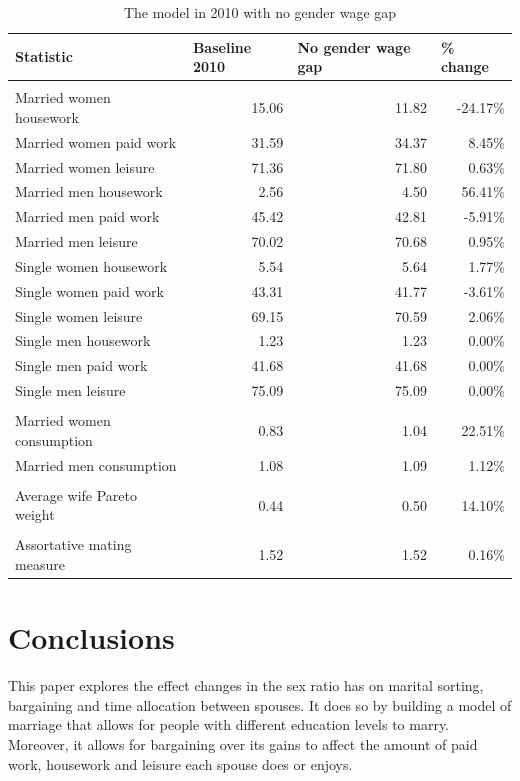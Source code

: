 \documentclass[12pt]{article}
\begin{document}
\begin{table}[]
	\centering
	\caption{The model in 2010 with no gender wage gap}
	\begin{tabular}{lrrr}
		\toprule
		Statistic & \multicolumn{1}{l}{Baseline 2010} & \multicolumn{1}{l}{No gender wage gap} & \multicolumn{1}{l}{\% change} \\
		\midrule
		&       &       &  \\
		Married women housework & 15.06 & 11.82 & -24.17\% \\
		Married women paid work & 31.59 & 34.37 & 8.45\% \\
		Married women leisure & 71.36 & 71.80 & 0.63\% \\
		Married men housework & 2.56  & 4.50  & 56.41\% \\
		Married men paid work & 45.42 & 42.81 & -5.91\% \\
		Married men leisure & 70.02 & 70.68 & 0.95\% \\
		Single women housework & 5.54  & 5.64  & 1.77\% \\
		Single women paid work & 43.31 & 41.77 & -3.61\% \\
		Single women leisure & 69.15 & 70.59 & 2.06\% \\
		Single men housework & 1.23  & 1.23  & 0.00\% \\
		Single men paid work & 41.68 & 41.68 & 0.00\% \\
		Single men leisure & 75.09 & 75.09 & 0.00\% \\
		&       &       &  \\
		Married women consumption & 0.83  & 1.04  & 22.51\% \\
		Married men consumption & 1.08  & 1.09  & 1.12\% \\
		&       &       &  \\
		Average wife Pareto weight & 0.44  & 0.50  & 14.10\% \\
		&       &       &  \\
		Assortative mating measure & 1.52  & 1.52  & 0.16\% \\
		\bottomrule
		\bottomrule
	\end{tabular}
	\label{tab:quant_exp_3}
\end{table}


\section{Conclusions} \label{sec:conclusions}

This paper explores the effect changes in the sex ratio has on marital sorting, bargaining and time allocation between spouses. It does so by building a model of marriage that allows for people with different education levels to marry. Moreover, it allows for bargaining over its gains to affect the amount of paid work, housework and leisure each spouse does or enjoys. 
\end{document}
